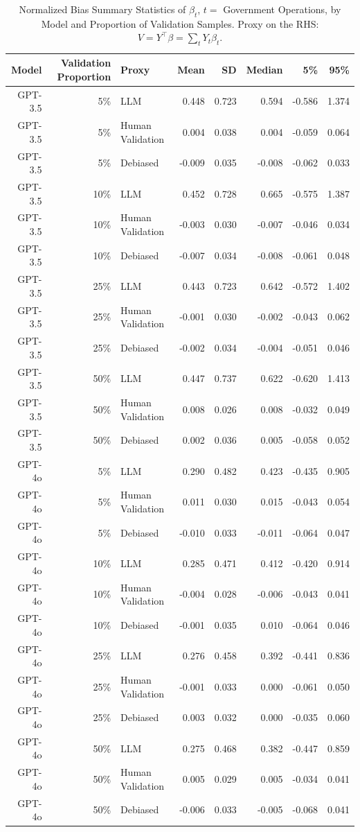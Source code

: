 \begin{table}

\caption{\label{tab:unnamed-chunk-1}Normalized Bias Summary Statistics of $\beta_{t}$, $t=$ Government Operations, by Model and Proportion of Validation Samples.
      Proxy on the RHS: $V = Y^\top \beta = \sum_{t} Y_t \beta_t$.}
\centering
\begin{tabular}[t]{rrlrrrrr}
\toprule
Model & Validation Proportion & Proxy & Mean & SD & Median & 5\% & 95\%\\
\midrule
GPT-3.5 & 5\% & LLM & 0.448 & 0.723 & 0.594 & -0.586 & 1.374\\
GPT-3.5 & 5\% & Human Validation & 0.004 & 0.038 & 0.004 & -0.059 & 0.064\\
GPT-3.5 & 5\% & Debiased & -0.009 & 0.035 & -0.008 & -0.062 & 0.033\\
GPT-3.5 & 10\% & LLM & 0.452 & 0.728 & 0.665 & -0.575 & 1.387\\
GPT-3.5 & 10\% & Human Validation & -0.003 & 0.030 & -0.007 & -0.046 & 0.034\\
GPT-3.5 & 10\% & Debiased & -0.007 & 0.034 & -0.008 & -0.061 & 0.048\\
GPT-3.5 & 25\% & LLM & 0.443 & 0.723 & 0.642 & -0.572 & 1.402\\
GPT-3.5 & 25\% & Human Validation & -0.001 & 0.030 & -0.002 & -0.043 & 0.062\\
GPT-3.5 & 25\% & Debiased & -0.002 & 0.034 & -0.004 & -0.051 & 0.046\\
GPT-3.5 & 50\% & LLM & 0.447 & 0.737 & 0.622 & -0.620 & 1.413\\
GPT-3.5 & 50\% & Human Validation & 0.008 & 0.026 & 0.008 & -0.032 & 0.049\\
GPT-3.5 & 50\% & Debiased & 0.002 & 0.036 & 0.005 & -0.058 & 0.052\\
GPT-4o & 5\% & LLM & 0.290 & 0.482 & 0.423 & -0.435 & 0.905\\
GPT-4o & 5\% & Human Validation & 0.011 & 0.030 & 0.015 & -0.043 & 0.054\\
GPT-4o & 5\% & Debiased & -0.010 & 0.033 & -0.011 & -0.064 & 0.047\\
GPT-4o & 10\% & LLM & 0.285 & 0.471 & 0.412 & -0.420 & 0.914\\
GPT-4o & 10\% & Human Validation & -0.004 & 0.028 & -0.006 & -0.043 & 0.041\\
GPT-4o & 10\% & Debiased & -0.001 & 0.035 & 0.010 & -0.064 & 0.046\\
GPT-4o & 25\% & LLM & 0.276 & 0.458 & 0.392 & -0.441 & 0.836\\
GPT-4o & 25\% & Human Validation & -0.001 & 0.033 & 0.000 & -0.061 & 0.050\\
GPT-4o & 25\% & Debiased & 0.003 & 0.032 & 0.000 & -0.035 & 0.060\\
GPT-4o & 50\% & LLM & 0.275 & 0.468 & 0.382 & -0.447 & 0.859\\
GPT-4o & 50\% & Human Validation & 0.005 & 0.029 & 0.005 & -0.034 & 0.041\\
GPT-4o & 50\% & Debiased & -0.006 & 0.033 & -0.005 & -0.068 & 0.041\\
\bottomrule
\end{tabular}
\end{table}
